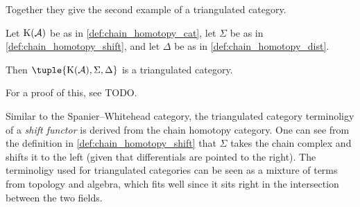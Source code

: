 Together they give the second example of a triangulated category.

\begin{example}
    Let \( \operatorname{K}({\mathcal{A}}) \) be as in \autoref{def:chain_homotopy_cat}, let \( \Sigma \) be as in \autoref{def:chain_homotopy_shift}, and let \( \Delta \) be as in \autoref{def:chain_homotopy_dist}.

    Then \( \tuple{\K(\Ac), \Sigma, \Delta} \) is a triangulated category.
\end{example}

For a proof of this, see TODO.

Similar to the Spanier--Whitehead category, the triangulated category terminoligy of a \emph{shift functor} is derived from the chain homotopy category. One can see from the definition in \autoref{def:chain_homotopy_shift} that \( \Sigma \) takes the chain complex and shifts it to the left (given that differentials are pointed to the right). The terminoligy used for triangulated categories can be seen as a mixture of terms from topology and algebra, which fits well since it sits right in the intersection between the two fields.
